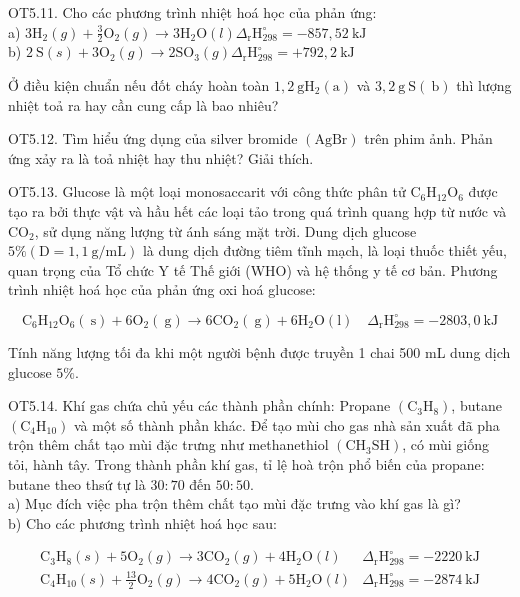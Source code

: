 \documentclass[10pt]{article}
\begin{document}
OT5.11. Cho các phương trình nhiệt hoá học của phản ứng:\\
a) $3 \mathrm{H}_{2}(g)+\frac{3}{2} \mathrm{O}_{2}(g) \rightarrow 3 \mathrm{H}_{2} \mathrm{O}(l) \Delta_{\mathrm{r}} \mathrm{H}_{298}^{\circ}=-857,52 \mathrm{~kJ}$\\
b) $2 \mathrm{~S}(s)+3 \mathrm{O}_{2}(g) \rightarrow 2 \mathrm{SO}_{3}(g) \Delta_{\mathrm{r}} \mathrm{H}_{298}^{\circ}=+792,2 \mathrm{~kJ}$

Ở điều kiện chuẩn nếu đốt cháy hoàn toàn $1,2 \mathrm{~g} \mathrm{H}_{2}(\mathrm{a})$ và $3,2 \mathrm{~g} \mathrm{~S}(\mathrm{~b})$ thì lượng nhiệt toả ra hay cần cung cấp là bao nhiêu?

OT5.12. Tìm hiểu ứng dụng của silver bromide $(\mathrm{AgBr})$ trên phim ảnh. Phản ứng xảy ra là toả nhiệt hay thu nhiệt? Giải thích.

OT5.13. Glucose là một loại monosaccarit với công thức phân tử $\mathrm{C}_{6} \mathrm{H}_{12} \mathrm{O}_{6}$ được tạo ra bởi thực vật và hầu hết các loại tảo trong quá trình quang hợp từ nước và $\mathrm{CO}_{2}$, sử dụng năng lượng từ ánh sáng mặt trời. Dung dịch glucose $5 \% (\mathrm{D}=1,1 \mathrm{~g} / \mathrm{mL})$ là dung dịch đường tiêm tĩnh mạch, là loại thuốc thiết yếu, quan trọng của Tổ chức Y tế Thế giới (WHO) và hệ thống y tế cơ bản. Phương trình nhiệt hoá học của phản ứng oxi hoá glucose:

$$
\mathrm{C}_{6} \mathrm{H}_{12} \mathrm{O}_{6}(\mathrm{~s})+6 \mathrm{O}_{2}(\mathrm{~g}) \rightarrow 6 \mathrm{CO}_{2}(\mathrm{~g})+6 \mathrm{H}_{2} \mathrm{O}(\mathrm{l}) \quad \Delta_{\mathrm{r}} \mathrm{H}_{298}^{\circ}=-2803,0 \mathrm{~kJ}
$$

Tính năng lượng tối đa khi một người bệnh được truyền 1 chai 500 mL dung dịch glucose $5 \%$.

OT5.14. Khí gas chứa chủ yếu các thành phần chính: Propane $\left(\mathrm{C}_{3} \mathrm{H}_{8}\right)$, butane $\left(\mathrm{C}_{4} \mathrm{H}_{10}\right)$ và một số thành phần khác. Để tạo mùi cho gas nhà sản xuất đã pha trộn thêm chất tạo mùi đặc trưng như methanethiol $\left(\mathrm{CH}_{3} \mathrm{SH}\right)$, có mùi giống tỏi, hành tây. Trong thành phần khí gas, tỉ lệ hoà trộn phổ biến của propane: butane theo thsứ tự là $30: 70$ đến $50: 50$.\\
a) Mục đích việc pha trộn thêm chất tạo mùi đặc trưng vào khí gas là gì?\\
b) Cho các phương trình nhiệt hoá học sau:

$$
\begin{array}{ll}
\mathrm{C}_{3} \mathrm{H}_{8}(s)+5 \mathrm{O}_{2}(g) \rightarrow 3 \mathrm{CO}_{2}(g)+4 \mathrm{H}_{2} \mathrm{O}(l) & \Delta_{\mathrm{r}} \mathrm{H}_{298}^{\circ}=-2220 \mathrm{~kJ} \\
\mathrm{C}_{4} \mathrm{H}_{10}(s)+\frac{13}{2} \mathrm{O}_{2}(g) \rightarrow 4 \mathrm{CO}_{2}(g)+5 \mathrm{H}_{2} \mathrm{O}(l) & \Delta_{\mathrm{r}} \mathrm{H}_{298}^{\circ}=-2874 \mathrm{~kJ}
\end{array}
$$
\end{document}
